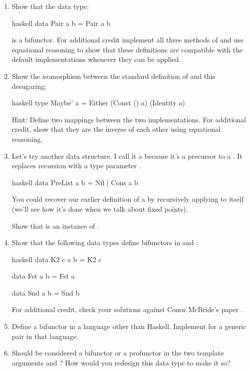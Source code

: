 \begin{enumerate}
  \tightlist
  \item
        Show that the data type:

        \begin{snip}{haskell}
data Pair a b = Pair a b
\end{snip}

        is a bifunctor. For additional credit implement all three methods of
         and use equational reasoning to show that these
        definitions are compatible with the default implementations whenever
        they can be applied.
  \item
        Show the isomorphism between the standard definition of 
        and this desugaring:

        \begin{snip}{haskell}
type Maybe' a = Either (Const () a) (Identity a)
\end{snip}

        Hint: Define two mappings between the two implementations. For
        additional credit, show that they are the inverse of each other using
        equational reasoning.
  \item
        Let's try another data structure. I call it a  because
        it's a precursor to a . It replaces recursion with a type
        parameter .

        \begin{snip}{haskell}
data PreList a b = Nil | Cons a b
\end{snip}

        You could recover our earlier definition of a  by
        recursively applying  to itself (we'll see how it's
        done when we talk about fixed points).

        Show that  is an instance of .
  \item
        Show that the following data types define bifunctors in  and
        :

        \begin{snip}{haskell}
data K2 c a b = K2 c

data Fst a b = Fst a

data Snd a b = Snd b
\end{snip}

        For additional credit, check your solutions against Conor McBride's
        paper .
  \item
        Define a bifunctor in a language other than Haskell. Implement
         for a generic pair in that language.
  \item
        Should  be considered a bifunctor or a profunctor in
        the two template arguments  and ? How would you
        redesign this data type to make it so?
\end{enumerate}
